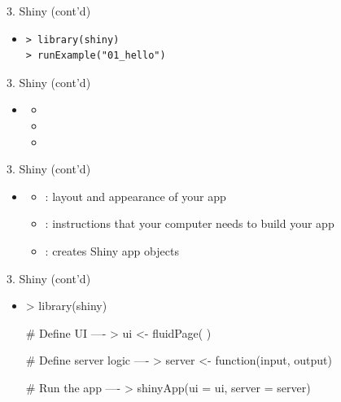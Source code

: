 \documentclass[14pt, aspectratio=169, sectionpage=simple, xclolor=table]{beamer}
\begin{document}
\begin{frame}[fragile]{3. Shiny (cont'd)}
\begin{itemize}
\item {}
\begin{verbatim}
> library(shiny)
> runExample("01_hello")
\end{verbatim}
\end{itemize}
\end{frame}

\begin{frame}[fragile]{3. Shiny (cont'd)}
\begin{itemize}
\item {}
\begin{itemize}
\item {}
\item {}
\item {}
\end{itemize}
\end{itemize}
\end{frame}
\begin{frame}{3. Shiny (cont'd)}
\begin{itemize}
\item {}
\begin{itemize}
\item {}: layout and appearance of your app
\item {}: instructions that your computer needs to build your app
\item {}: creates Shiny app objects
\end{itemize}
\end{itemize}
\end{frame}
\begin{frame}[fragile]{3. Shiny (cont'd)}
\begin{itemize}
\item {}
\nl
\begin{footnotesize}
\begin{code11}
> library(shiny)

# Define UI ----
> ui <- fluidPage(
)

# Define server logic ----
> server <- function(input, output) {
}

# Run the app ----
> shinyApp(ui = ui, server = server)
\end{code11}
\end{footnotesize}
\end{itemize}
\end{frame}
\end{document}
